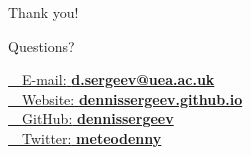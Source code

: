 \documentclass[10pt,draft]{beamer}
\newcommand{\emailsymbol}   {\faEnvelope~~}  %
\newcommand{\homepagesymbol}{\faGlobe~~}  %
\newcommand{\twittersymbol} {\faTwitter~~}
\newcommand{\githubsymbol}  {\faGithub~~}
\begin{document}
{
\begin{frame}{Thank you!}

{\Huge Questions?}
\vspace{2cm}

\href{mailto:d.sergeev@uea.ac.uk}{\emailsymbol \small{E-mail:} \textbf{d.sergeev@uea.ac.uk}}\\
\href{https://dennissergeev.github.io}{\homepagesymbol \small{Website:} \textbf{dennissergeev.github.io}}\\
\href{http://github.com/dennissergeev}{\githubsymbol \small{GitHub:} \textbf{dennissergeev}}\\
\href{http://twitter.com/meteodenny}{\twittersymbol \small{Twitter:} \textbf{meteodenny}}
\end{frame}
}









\end{document}
